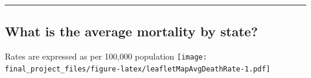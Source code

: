 \documentclass[]{article}
\begin{document}
\begin{center}\rule{0.5\linewidth}{\linethickness}\end{center}

\hypertarget{what-is-the-average-mortality-by-state}{%
\subsection{What is the average mortality by
state?}\label{what-is-the-average-mortality-by-state}}

Rates are expressed as per 100,000 population
\texttt{[image: final\_project\_files/figure-latex/leafletMapAvgDeathRate-1.pdf]}
\end{document}
